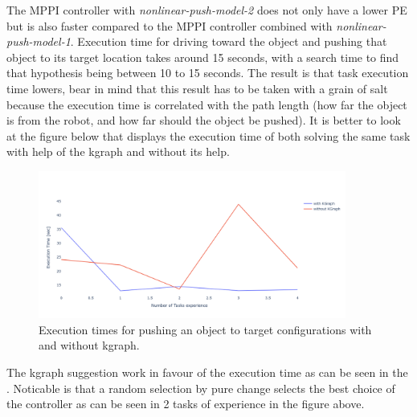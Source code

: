 
The \ac{MPPI} controller with \textit{nonlinear-push-model-2} does not only have a lower \ac{PE} but is also faster compared to the \ac{MPPI} controller combined with \textit{nonlinear-push-model-1}. Execution time for driving toward the object and pushing that object to its target location takes around 15 seconds, with a search time to find that hypothesis being between 10 to 15 seconds. The result is that task execution time lowers, bear in mind that this result has to be taken with a grain of salt because the execution time is correlated with the path length (how far the object is from the robot, and how far should the object be pushed). It is better to look at the figure below that displays the execution time of both solving the same task with help of the \ac{kgraph} and without its help.

\begin{figure}[H]
    \centering
    \includegraphics[width=0.9\textwidth]{figures/results/random_push_with_without_kgraph}
    \caption{Execution times for pushing an object to target configurations with and without \ac{kgraph}.}%
    \label{fig:random_push_with_without_kgraph}
\end{figure}

The \ac{kgraph} suggestion work in favour of the execution time as can be seen in the . Noticable is that a random selection by pure change selects the best choice of the controller as can be seen in 2 tasks of experience in the figure above.

%
%
%

